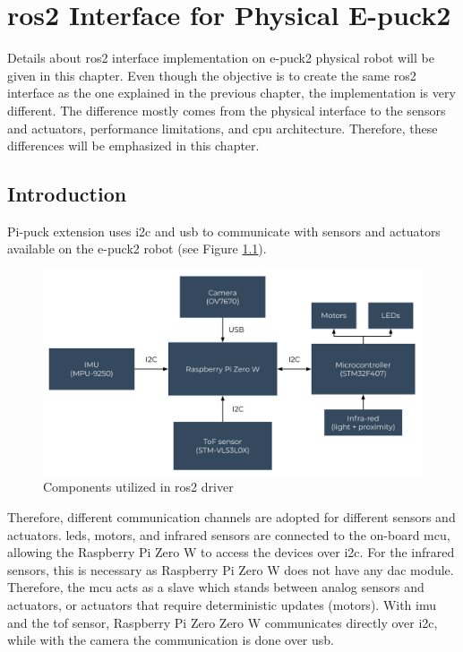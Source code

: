 \chapter{\acs{ros2} Interface for Physical E-puck2}
\label{chap:physical}

Details about \ac{ros2} interface implementation on e-puck2 physical robot will be given in this chapter.
Even though the objective is to create the same \ac{ros2} interface as the one explained in the previous chapter, the implementation is very different.
The difference mostly comes from the physical interface to the sensors and actuators, performance limitations, and \ac{cpu} architecture.
Therefore, these differences will be emphasized in this chapter.

\section{Introduction}

Pi-puck extension uses \ac{i2c} and \ac{usb} to communicate with sensors and actuators available on the e-puck2 robot (see Figure \ref{fig:physical:general}).

\begin{figure}[H]
    \centering
    \includegraphics[width=\textwidth]{physical/figures/general.pdf}
    \caption{Components utilized in \ac{ros2} driver}
    \label{fig:physical:general}
\end{figure}

Therefore, different communication channels are adopted for different sensors and actuators.
\acp{led}, motors, and infrared sensors are connected to the on-board \ac{mcu}, allowing the Raspberry Pi Zero W to access the devices over \ac{i2c}.
For the infrared sensors, this is necessary as Raspberry Pi Zero W does not have any \ac{dac} module. 
Therefore, the \ac{mcu} acts as a slave which stands between analog sensors and actuators, or actuators that require deterministic updates (motors).
With \ac{imu} and the \ac{tof} sensor, Raspberry Pi Zero Zero W communicates directly over \ac{i2c}, while with the camera the communication is done over \ac{usb}. 

